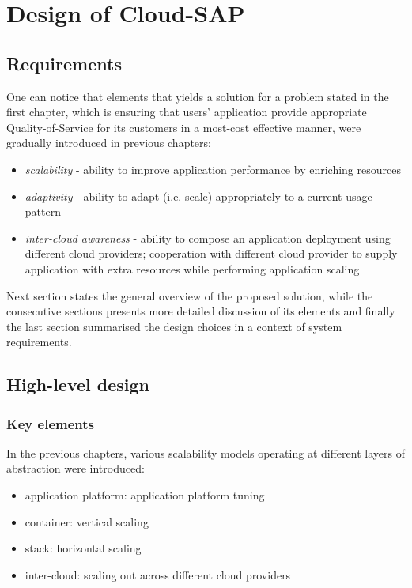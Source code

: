 \chapter{Design of Cloud-SAP}


\section{Requirements}
One can notice that elements that yields a solution for a problem stated in the first chapter, which is ensuring that users' application provide appropriate Quality-of-Service for its customers in a most-cost effective manner, were gradually introduced in previous chapters:

\begin{itemize}
	\item \emph{scalability} - ability to improve application performance by enriching resources
	\item \emph{adaptivity} - ability to adapt (i.e. scale) appropriately to a current usage pattern
	\item \emph{inter-cloud awareness} - ability to compose an application deployment using different cloud providers; cooperation with different cloud provider to supply application with extra resources while performing application scaling
\end{itemize}

Next section states the general overview of the proposed solution, while the consecutive sections presents more detailed discussion of its elements and finally the last section summarised the design choices in a context of system requirements.
	
\section{High-level design}
\subsection{Key elements}
In the previous chapters, various scalability models operating at different layers of abstraction were introduced: 
\begin{itemize}
	\item application platform: application platform tuning
	\item container: vertical scaling
	\item stack: horizontal scaling
	\item inter-cloud: scaling out across different cloud providers
\end{itemize}

